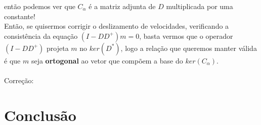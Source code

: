 \documentclass{article}
\begin{document}
então podemos ver que $C_{\alpha}$ é a matriz adjunta de $D$ multiplicada por uma constante!
\\ Então, se quisermos corrigir o deslizamento de velocidades, verificando a consistência da equação $(I-DD^+)m = 0$, basta vermos que o operador $(I - DD^+)$ projeta $m$ no $ker(D^*)$,
logo a relação que queremos manter válida é que $m$ seja \textbf{ortogonal} ao vetor que compõem a base do $ker(C_{\alpha})$.
\\ \\ Correção:


\section{Conclusão}
\end{document}
